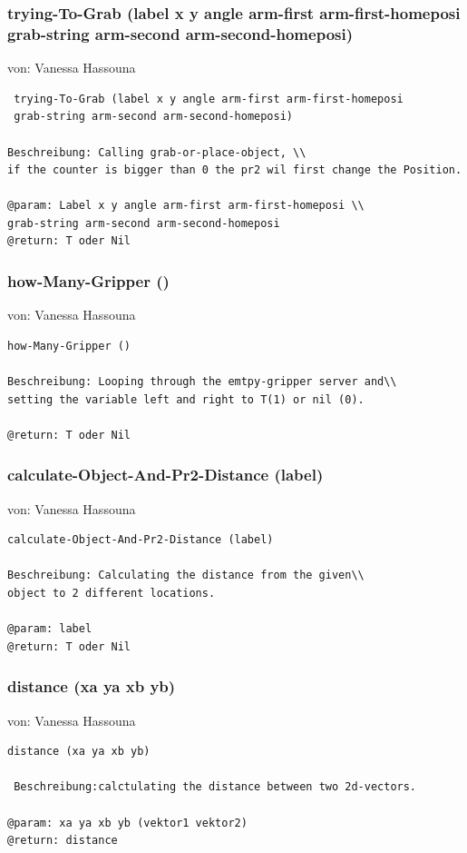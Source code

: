 \documentclass{suturo}
\makeatletter
\newcommand{\chapterauthor}[1]{%
  {\parindent0pt\vspace*{-27pt}%
  \linespread{0}\small\begin{flushright}von: #1\end{flushright}%
  \par\nobreak\vspace*{0pt}}
  \@afterheading%
}
\makeatother
\begin{document}
\subsubsection{ trying-To-Grab (label x y angle arm-first arm-first-homeposi \\
grab-string arm-second arm-second-homeposi)}
\chapterauthor{Vanessa Hassouna}
\begin{verbatim} 
 trying-To-Grab (label x y angle arm-first arm-first-homeposi
 grab-string arm-second arm-second-homeposi)

Beschreibung: Calling grab-or-place-object, \\
if the counter is bigger than 0 the pr2 wil first change the Position.

@param: Label x y angle arm-first arm-first-homeposi \\
grab-string arm-second arm-second-homeposi
@return: T oder Nil
\end{verbatim}

\subsubsection{how-Many-Gripper ()}
\chapterauthor{Vanessa Hassouna}
\begin{verbatim} 
how-Many-Gripper ()

Beschreibung: Looping through the emtpy-gripper server and\\
setting the variable left and right to T(1) or nil (0).

@return: T oder Nil
\end{verbatim}


\subsubsection{calculate-Object-And-Pr2-Distance (label)}
\chapterauthor{Vanessa Hassouna}
\begin{verbatim} 
calculate-Object-And-Pr2-Distance (label)

Beschreibung: Calculating the distance from the given\\
object to 2 different locations.

@param: label
@return: T oder Nil
\end{verbatim}


\subsubsection{distance (xa ya xb yb)}
\chapterauthor{Vanessa Hassouna}
\begin{verbatim}
distance (xa ya xb yb)

 Beschreibung:calctulating the distance between two 2d-vectors.

@param: xa ya xb yb (vektor1 vektor2)
@return: distance
\end{verbatim}
\end{document}
